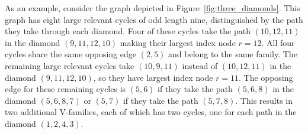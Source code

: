 \documentclass[fleqn,11pt]{article}
\begin{document}
As an example, consider the graph depicted in Figure~\ref{fig:three_diamonds}. 
This graph has eight large relevant cycles of odd length nine, distinguished by the path they take through each diamond.
Four of these cycles take the path $(10,12,11)$ in the 
diamond $(9,11,12,10)$
making their largest index node $r=12$. 
All four cycles share the same opposing edge $(2,5)$ and belong to the same family. The remaining large relevant cycles take $(10,9,11)$ instead of $(10,12,11)$ in the diamond $(9,11,12,10)$, so they have largest index node $r=11$. The opposing edge for these remaining cycles is $(5,6)$ if they take the path $(5,6,8)$ in the diamond $(5,6,8,7)$ or $(5,7)$ if they take the path $(5,7,8)$. This results in two additional V-families, each of which has two cycles, one for each path in the diamond $(1,2,4,3)$.%
\end{document}
